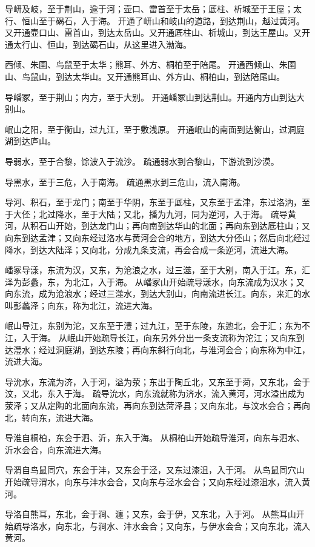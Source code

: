 \documentclass[a4paper,12pt,UTF8,twoside]{ctexbook}
\begin{document}
导岍及岐，至于荆山，逾于河；壶口、雷首至于太岳；厎柱、析城至于王屋；太行、恒山至于碣石，入于海。
开通了岍山和岐山的道路，到达荆山，越过黄河。又开通壶口山、雷首山，到达太岳山。又开通厎柱山、析城山，到达王屋山。又开通太行山、恒山，到达碣石山，从这里进入渤海。

西倾、朱圉、鸟鼠至于太华；熊耳、外方、桐柏至于陪尾。
开通西倾山、朱圉山、鸟鼠山，到达太华山。又开通熊耳山、外方山、桐柏山，到达陪尾山。

导嶓冢，至于荆山；内方，至于大别。
开通嶓冢山到达荆山。开通内方山到达大别山。

岷山之阳，至于衡山，过九江，至于敷浅原。
开通岷山的南面到达衡山，过洞庭湖到达庐山。

导弱水，至于合黎，馀波入于流沙。
疏通弱水到合黎山，下游流到沙漠。

导黑水，至于三危，入于南海。
疏通黑水到三危山，流入南海。

导河、积石，至于龙门；南至于华阴，东至于厎柱，又东至于孟津，东过洛汭，至于大伾；北过降水，至于大陆；又北，播为九河，同为逆河，入于海。
疏导黄河，从积石山开始，到达龙门山；再向南到达华山的北面；再向东到达厎柱山；又向东到达孟津；又向东经过洛水与黄河会合的地方，到达大分伾山；然后向北经过降水，到达大陆泽；又向北，分成九条支流，再会合成一条逆河，流进大海。

嶓冢导漾，东流为汉，又东，为沧浪之水，过三澨，至于大别，南入于江。东，汇泽为彭蠡，东，为北江，入于海。
从嶓冢山开始疏导漾水，向东流成为汉水；又向东流，成为沧浪水；经过三澨水，到达大别山，向南流进长江。向东，来汇的水叫彭蠡泽；向东，称为北江，流进大海。

岷山导江，东别为沱，又东至于澧；过九江，至于东陵，东迆北，会于汇；东为不江，入于海。
从岷山开始疏导长江，向东另外分出一条支流称为沱江；又向东到达澧水；经过洞庭湖，到达东陵；再向东斜行向北，与淮河会合；向东称为中江，流进大海。

导沇水，东流为济，入于河，溢为荥；东出于陶丘北，又东至于菏，又东北，会于汶，又北，东入于海。
疏导沇水，向东流就称为济水，流入黄河，河水溢出成为荥泽；又从定陶的北面向东流，再向东到达菏泽县；又向东北，与汶水会合；再向北，转向东，流进大海。

导淮自桐柏，东会于泗、沂，东入于海。
从桐柏山开始疏导淮河，向东与泗水、沂水会合，向东流进大海。

导渭自鸟鼠同穴，东会于沣，又东会于泾，又东过漆沮，入于河。
从鸟鼠同穴山开始疏导渭水，向东与沣水会合，又向东与泾水会合；又向东经过漆沮水，流入黄河。

导洛自熊耳，东北，会于涧、瀍；又东，会于伊，又东北，入于河。
从熊耳山开始疏导洛水，向东北，与涧水、沣水会合；又向东，与伊水会合；又向东北，流入黄河。
\end{document}

